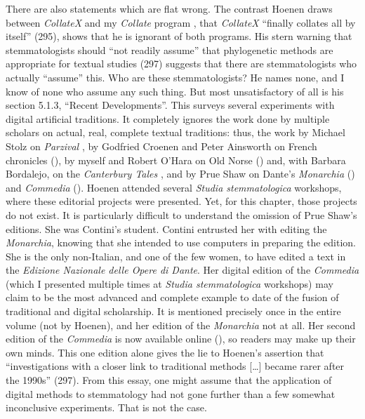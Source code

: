 \documentclass{article}
\begin{document}
There are also statements which are flat wrong. The contrast
Hoenen draws between \emph{CollateX} \parencite{dekker_collatex_2010} and my
\emph{Collate} program \parencite{robinson_collate_2014}, that \emph{CollateX} ``finally
collates all by itself'' (295), shows that he is ignorant of both
programs. His stern warning that stemmatologists should ``not readily
assume'' that phylogenetic methods are appropriate for textual studies
(297) suggests that there are stemmatologists who actually ``assume''
this. Who are these stemmatologists? He names none, and I know of none
who assume any such thing. But most unsatisfactory of all is his section
5.1.3, ``Recent Developments''. This surveys several experiments with
digital artificial traditions. It completely ignores the work done by
multiple scholars on actual, real, complete textual traditions: thus,
the work by Michael Stolz on \emph{Parzival} \parencite{von_eschenbach_parzival-projekt_2022}, by
Godfried Croenen and Peter Ainsworth on French chronicles (\citeyear{croenen_online_2010}), by
myself and Robert O'Hara on Old Norse (\citeyear{robinson_report_1992}) and, with Barbara
Bordalejo, on the \emph{Canterbury Tales} \parencite{chaucer_canterbury_1991}, and by Prue
Shaw on Dante's \emph{Monarchia} (\citeyear{alighieri_monarchia_2019}) and \emph{Commedia} (\citeyear{alighieri_commedia_2021}).
Hoenen attended several \emph{Studia stemmatologica} workshops, where
these editorial projects were presented. Yet, for this chapter, those
projects do not exist. It is particularly difficult to understand the
omission of Prue Shaw's editions. She was Contini's student. Contini
entrusted her with editing the \emph{Monarchia}, knowing that she
intended to use computers in preparing the edition. She is the only
non-Italian, and one of the few women, to have edited a text in the
\emph{Edizione Nazionale delle Opere di Dante}. Her digital edition of
the \emph{Commedia} (which I presented multiple times at \emph{Studia
stemmatologica} workshops) may claim to be the most advanced and
complete example to date of the fusion of traditional and digital
scholarship. It is mentioned precisely once in the entire volume (not by
Hoenen), and her edition of the \emph{Monarchia} not at all. Her second
edition of the \emph{Commedia} is now available online (\citeyear{alighieri_commedia_2021}), so
readers may make up their own minds. This one edition alone gives the
lie to Hoenen's assertion that ``investigations with a closer link to
traditional methods [\ldots] became rarer after the 1990s'' (297).
From this essay, one might assume that the application of digital
methods to stemmatology had not gone further than a few somewhat
inconclusive experiments. That is not the case.
\end{document}
